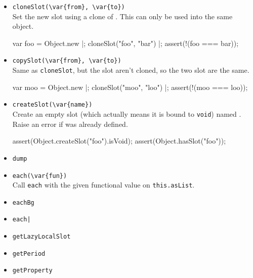 \begin{itemize}
\item \lstinline|cloneSlot(\var{from}, \var{to})|\\
  Set the new slot  using a clone of . This can only
  be used into the same object.

\begin{urbiscript}[firstnumber=last]
var foo = Object.new |;
cloneSlot("foo", "bar") |;
assert(!(foo === bar));
\end{urbiscript}

\item \lstinline|copySlot(\var{from}, \var{to})|\\
  Same as \lstinline|cloneSlot|, but the slot aren't cloned, so the
  two slot are the same.

\begin{urbiscript}[firstnumber=last]
var moo = Object.new |;
cloneSlot("moo", "loo") |;
assert(!(moo === loo));
\end{urbiscript}

\item \lstinline|createSlot(\var{name})|\\
  Create an empty slot (which actually means it is bound to
  \lstinline|void|) named .  Raise an error if 
  was already defined.

\begin{urbiscript}[firstnumber=last]
assert(Object.createSlot("foo").isVoid);
assert(Object.hasSlot("foo"));
\end{urbiscript}

\item \lstinline|dump|\\

\item \lstinline|each(\var{fun})|\\
  Call \lstinline|each| with the given functional value on
  \lstinline|this.asList|.

\item \lstinline|eachBg|\\

\item \lstinline$each|$\\

\item \lstinline|getLazyLocalSlot|\\

\item \lstinline|getPeriod|\\

\item \lstinline|getProperty|\\


\end{itemize}
